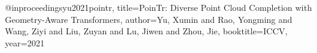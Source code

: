 @inproceedings{yu2021pointr,
  title={PoinTr: Diverse Point Cloud Completion with Geometry-Aware Transformers},
  author={Yu, Xumin and Rao, Yongming and Wang, Ziyi and Liu, Zuyan and Lu, Jiwen and Zhou, Jie},
  booktitle={ICCV},
  year={2021}
}